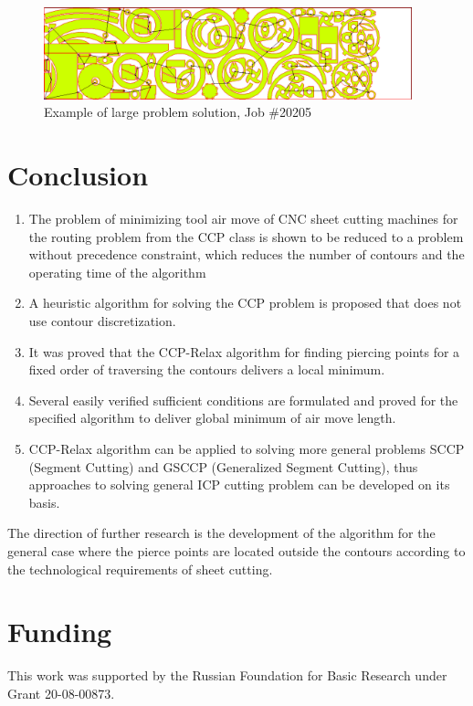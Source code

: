 \documentclass[]{llncs}
\begin{document}
\begin{figure}
  \begin{center}
    \includegraphics[width=0.95\textwidth]{test5-ccp.png}
  \end{center}
  \caption{Example of large problem solution, Job \#20205}
  \label{large-path}
\end{figure}

\section{Conclusion}
\label{sec:conclude}

\begin{enumerate}
  \item
  The problem of minimizing tool air move of CNC sheet cutting machines
  for the routing problem from the CCP class
  is shown to be reduced
  to a problem without precedence constraint,
  which reduces the number of contours and the operating time of the algorithm
  \item
  A heuristic algorithm for solving the CCP problem is proposed that does not use contour discretization.
  \item
  It was proved that the CCP-Relax
  algorithm for finding piercing points for a fixed order of traversing the contours
  delivers a local minimum.
  \item
  Several easily verified sufficient conditions are formulated and proved
  for the specified algorithm to deliver global minimum of air move length.
  \item
  CCP-Relax
  algorithm can be applied to solving more general problems
  SCCP (Segment Cutting) and
  GSCCP (Generalized Segment Cutting),
  thus approaches to solving general
  ICP cutting problem can be developed on its basis.
\end{enumerate}

The direction of further research is the development of the algorithm
for the general case where the pierce points
are located
outside the contours
according to the technological requirements of sheet cutting.

\section*{Funding}

This work was supported by the
Russian Foundation for Basic Research
under Grant
20-08-00873.



\end{document}
